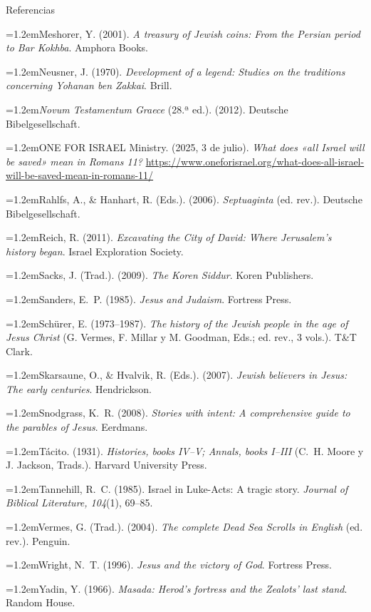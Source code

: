 \documentclass[hyperref={bookmarks=false},aspectratio=169]{beamer}
\newcommand{\refapa}[1]{\par\hangindent=1.2em\hangafter=1\noindent #1\par\vspace{3pt}}
\begin{document}
\begin{frame}[allowframebreaks]{Referencias}
\refapa{Meshorer, Y. (2001). \emph{A treasury of Jewish coins: From the Persian period to Bar Kokhba}. Amphora Books.}
\refapa{Neusner, J. (1970). \emph{Development of a legend: Studies on the traditions concerning Yohanan ben Zakkai}. Brill.}
\refapa{\emph{Novum Testamentum Graece} (28.ª ed.). (2012). Deutsche Bibelgesellschaft.}
\refapa{ONE FOR ISRAEL Ministry. (2025, 3 de julio). \emph{What does «all Israel will be saved» mean in Romans 11?} \url{https://www.oneforisrael.org/what-does-all-israel-will-be-saved-mean-in-romans-11/}}
\refapa{Rahlfs, A., \& Hanhart, R. (Eds.). (2006). \emph{Septuaginta} (ed. rev.). Deutsche Bibelgesellschaft.}
\refapa{Reich, R. (2011). \emph{Excavating the City of David: Where Jerusalem's history began}. Israel Exploration Society.}
\refapa{Sacks, J. (Trad.). (2009). \emph{The Koren Siddur}. Koren Publishers.}
\refapa{Sanders, E.~P. (1985). \emph{Jesus and Judaism}. Fortress Press.}
\refapa{Schürer, E. (1973--1987). \emph{The history of the Jewish people in the age of Jesus Christ} (G. Vermes, F. Millar y M. Goodman, Eds.; ed. rev., 3 vols.). T\&T Clark.}
\refapa{Skarsaune, O., \& Hvalvik, R. (Eds.). (2007). \emph{Jewish believers in Jesus: The early centuries}. Hendrickson.}
\refapa{Snodgrass, K.~R. (2008). \emph{Stories with intent: A comprehensive guide to the parables of Jesus}. Eerdmans.}
\refapa{Tácito. (1931). \emph{Histories, books IV--V; Annals, books I--III} (C.~H. Moore y J. Jackson, Trads.). Harvard University Press.}
\refapa{Tannehill, R.~C. (1985). Israel in Luke-Acts: A tragic story. \emph{Journal of Biblical Literature, 104}(1), 69--85.}
\refapa{Vermes, G. (Trad.). (2004). \emph{The complete Dead Sea Scrolls in English} (ed. rev.). Penguin.}
\refapa{Wright, N.~T. (1996). \emph{Jesus and the victory of God}. Fortress Press.}
\refapa{Yadin, Y. (1966). \emph{Masada: Herod's fortress and the Zealots' last stand}. Random House.}
\end{frame}
\end{document}

